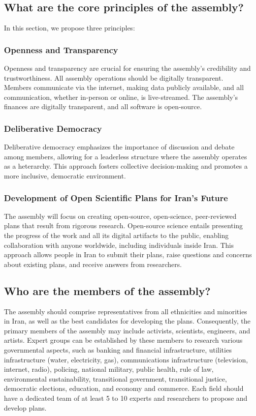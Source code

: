 \documentclass{IEEEtran}
\begin{document}
\subsection{What are the core principles of the assembly?}
In this section, we propose three principles:

\subsubsection{Openness and Transparency}
Openness and transparency are crucial for ensuring the assembly's credibility and trustworthiness. All assembly operations should be digitally transparent. Members communicate via the internet, making data publicly available, and all communication, whether in-person or online, is live-streamed. The assembly's finances are digitally transparent, and all software is open-source.

\subsubsection{Deliberative Democracy}
Deliberative democracy emphasizes the importance of discussion and debate among members, allowing for a leaderless structure where the assembly operates as a heterarchy. This approach fosters collective decision-making and promotes a more inclusive, democratic environment.

\subsubsection{Development of Open Scientific Plans for Iran's Future}
The assembly will focus on creating open-source, open-science, peer-reviewed plans that result from rigorous research. Open-source science entails presenting the progress of the work and all its digital artifacts to the public, enabling collaboration with anyone worldwide, including individuals inside Iran. This approach allows people in Iran to submit their plans, raise questions and concerns about existing plans, and receive answers from researchers.

\subsection{Who are the members of the assembly?}
The assembly should comprise representatives from all ethnicities and minorities in Iran, as well as the best candidates for developing the plans. Consequently, the primary members of the assembly may include activists, scientists, engineers, and artists. Expert groups can be established by these members to research various governmental aspects, such as banking and financial infrastructure, utilities infrastructure (water, electricity, gas), communications infrastructure (television, internet, radio), policing, national military, public health, rule of law, environmental sustainability, transitional government, transitional justice, democratic elections, education, and economy and commerce. Each field should have a dedicated team of at least 5 to 10 experts and researchers to propose and develop plans.
\end{document}
